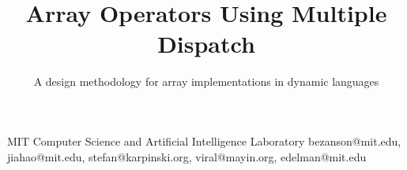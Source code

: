 \documentclass{sigplanconf}
\begin{document}
\setlength{\pdfpageheight}{\paperheight}
\setlength{\pdfpagewidth}{\paperwidth}




\permissiontopublish             %



\title{ Array Operators Using Multiple Dispatch }
\subtitle{A design methodology for array implementations in dynamic languages}

           {MIT Computer Science and Artificial Intelligence Laboratory}
  { bezanson@mit.edu, jiahao@mit.edu, stefan@karpinski.org, viral@mayin.org, edelman@mit.edu }

\maketitle
\end{document}
